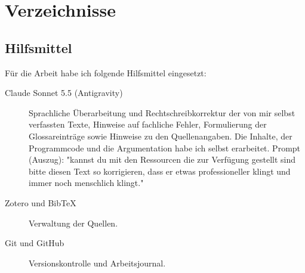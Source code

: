 \chapter{Verzeichnisse}
\label{chap:Verzeichnisse}

\nocite{*}
\printbibliography[heading=subbibnumbered]

\section{\listfigurename}
\begingroup
\makeatletter
\renewcommand{\chapter}[2]{}
\makeatother
\listoffigures
\endgroup

\section{\listtablename}
\begingroup
\makeatletter
\renewcommand{\chapter}{\@ifstar\@gobble\@gobble}
\makeatother
\listoftables
\endgroup

\section{Hilfsmittel}

Für die Arbeit habe ich folgende Hilfsmittel eingesetzt:
\begin{description}
\item[Claude Sonnet 5.5 (Antigravity)] Sprachliche Überarbeitung und Rechtschreibkorrektur der von mir selbst verfassten Texte, Hinweise auf fachliche Fehler, Formulierung der Glossareinträge sowie Hinweise zu den Quellenangaben. Die Inhalte, der Programmcode und die Argumentation habe ich selbst erarbeitet. Prompt (Auszug): "kannst du mit den Ressourcen die zur Verfügung gestellt sind bitte diesen Text so korrigieren, dass er etwas professioneller klingt und immer noch menschlich klingt."
\item[Zotero und BibTeX] Verwaltung der Quellen.
\item[Git und GitHub] Versionskontrolle und Arbeitsjournal.
\end{description}